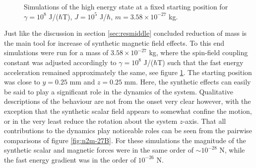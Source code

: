 \documentclass[main.tex]{subfiles}
\begin{document}
\begin{figure}[h]
    \centering
    \qquad
    \caption{\centering Simulations of the high energy state at a fixed starting position for \(\gamma
    = 10^{8}\) J/(\(\hbar{}\)T), \(J= 10^{5}\) J/\(\hbar{}\), \(m = 3.58\times 10^{-27}\) kg.}%
    \label{fig:n2m-27A}
\end{figure}

Just like the discussion in section \ref{sec:resmiddle} concluded reduction of mass is the
main tool for increase of synthetic magnetic field effects. To this end simulations were
run for a mass of \(3.58\times 10^{-27}\) kg, where the spin-field coupling constant was
adjusted accordingly to \(\gamma = 10^{8}\) J/(\(\hbar{}\)T) such that the fast energy
acceleration remained approximately the same, see figure \ref{fig:n2m-27A}. The starting
position was close to \(y= 0.25\) mm and \(z = 0.25\) mm. Here, the
synthetic effects can easily be said to play a significant role in the
dynamics of the system. Qualitative descriptions of the behaviour are not from the onset
very clear however, with the exception that the synthetic scalar field appears to somewhat confine the
motion, or in the very least reduce the rotation about the system \(z\)-axis. That all
contributions to the dynamics play noticeable roles can be seen from the pairwise
comparisons of figure \ref{fig:n2m-27B}. For these simulations the magnitude of the
synthetic scalar and magnetic forces were in the same order of \(\sim 10^{-28}\) N, while
the fast energy gradient was in the order of \(10^{-26}\) N.
\end{document}
